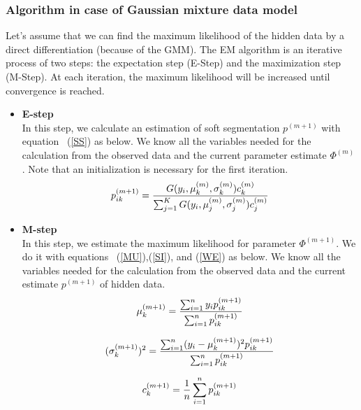 \subsubsection{Algorithm in case of Gaussian mixture data model}
Let's assume that we can find the maximum likelihood of the hidden data by a direct differentiation (because of the GMM). The EM algorithm is an iterative process of two steps: the expectation step (E-Step) and the maximization step (M-Step). At each iteration, the maximum likelihood will be increased until convergence is reached.\\
\begin{itemize}

\item \textbf{E-step}\\
In this step, we calculate an estimation of soft segmentation $p^{(m+1)}$ with equation ~(\ref{SS}) as below. We know all the variables needed for the calculation from the observed data and the current parameter estimate $\Phi^{(m)}$. Note that an initialization is necessary for the first iteration.\\

  \begin{equation*}
  p_{ik}^{(m+1)}= \frac{G(y_i,\mu_k^{(m)},\sigma_k^{(m)})c_k^{(m)}}{\sum_{j=1}^K G(y_i,\mu_j^{(m)},\sigma_j^{(m)})c_j^{(m)}}\\
  \end{equation*}

\item \textbf{M-step}\\
In this step, we estimate the maximum likelihood for parameter $\Phi^{(m+1)}$. We do it with equations ~(\ref{MU}),(\ref{SI}), and (\ref{WE}) as below. We know all the variables needed for the calculation from the observed data and the current estimate $p^{(m+1)}$ of hidden data.\\

  \begin{equation*}
  \mu_k^{(m+1)} = \frac{\sum_{i=1}^n y_ip_{ik}^{(m+1)}}{\sum_{i=1}^n p_{ik}^{(m+1)}}\\
  \end{equation*}

  \begin{equation*}
  (\sigma_k^{(m+1)})^2 = \frac{\sum_{i=1}^n (y_i-\mu_k^{(m+1)})^2p_{ik}^{(m+1)}}{\sum_{i=1}^n p_{ik}^{(m+1)}}\\
  \end{equation*}
  
  \begin{equation*}
  c_k^{(m+1)} = \frac{1}{n}\sum_{i=1}^n p_{ik}^{(m+1)}\\
  \end{equation*}
\end{itemize}

